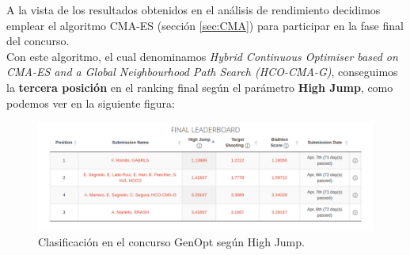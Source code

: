 A la vista de los resultados obtenidos en el análisis de rendimiento decidimos emplear el algoritmo CMA-ES (sección \ref{sec:CMA}) para participar en la fase final del concurso. \\
Con este algoritmo, el cual denominamos \textit{Hybrid Continuous Optimiser based on CMA-ES and a Global Neighbourhood Path Search (HCO-CMA-G)}, conseguimos la \textbf{tercera posición} en el ranking final según el parámetro \textbf{High Jump}, como podemos ver en la siguiente figura: 

\begin{figure}[!ht]
  \centering
	\includegraphics[scale=0.5]{images/final}
  \caption{Clasificación en el concurso GenOpt según High Jump.}
\end{figure}

\newpage